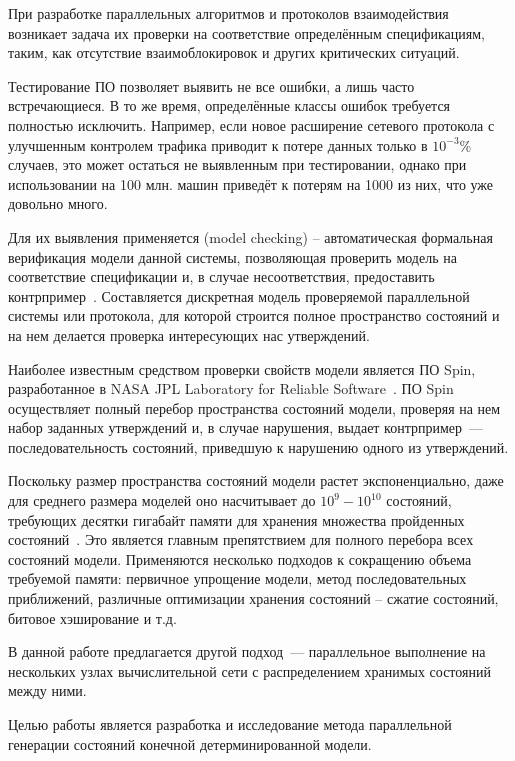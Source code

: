 \Introduction

При разработке параллельных алгоритмов и протоколов взаимодействия возникает задача их
проверки на соответствие определённым спецификациям, таким, как отсутствие
взаимоблокировок и других критических ситуаций.

Тестирование ПО позволяет выявить не все ошибки, а лишь часто встречающиеся. В то же
время, определённые классы ошибок требуется полностью исключить. Например, если новое
расширение сетевого протокола с улучшенным контролем трафика приводит к потере данных
только в $10^{-3}\%$ случаев, это может остаться не выявленным при тестировании, однако
при использовании на 100 млн. машин приведёт к потерям на 1000 из них, что уже довольно
много. 

Для их выявления применяется  (model checking) --
автоматическая формальная верификация модели данной системы, позволяющая проверить модель
на соответствие спецификации и, в случае несоответствия, предоставить
контрпример~\cite{Clarke}. Составляется дискретная модель проверяемой параллельной системы
или протокола, для которой строится полное пространство состояний и на нем делается
проверка интересующих нас утверждений.

Наиболее известным средством проверки свойств модели является ПО Spin, разработанное в
NASA JPL Laboratory for Reliable Software~\cite{SPIN}. ПО Spin осуществляет полный перебор
пространства состояний модели, проверяя на нем набор заданных утверждений и, в случае
нарушения, выдает контрпример~--- последовательность состояний, приведшую к нарушению
одного из утверждений.

Поскольку размер пространства состояний модели растет экспоненциально, даже для среднего
размера моделей оно насчитывает до $10^9 - 10^{10}$ состояний, требующих десятки гигабайт
памяти для хранения множества пройденных состояний~\cite{SpinRoot}. Это является главным
препятствием для полного перебора всех состояний модели. Применяются несколько подходов к
сокращению объема требуемой памяти: первичное упрощение модели, метод последовательных
приближений, различные оптимизации хранения состояний -- сжатие состояний, битовое
хэширование и т.д.~\cite{Katoen}

В данной работе предлагается другой подход~--- параллельное выполнение на нескольких узлах
вычислительной сети с распределением хранимых состояний между ними.

Целью работы является разработка и исследование метода параллельной генерации состояний
конечной детерминированной модели.

